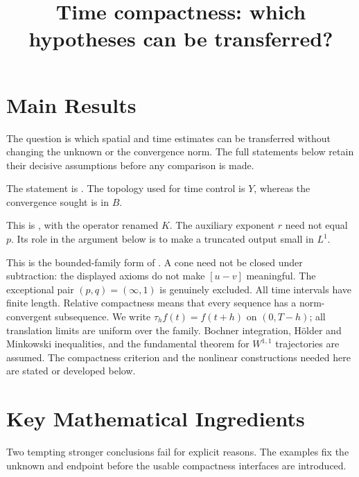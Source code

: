 \documentclass[12pt,reqno]{amsart}
\title{Time compactness: which hypotheses can be transferred?}
\date{}
\begin{document}
\maketitle
\section{Main Results}
The question is which spatial and time estimates can be transferred without changing the unknown or the convergence norm. The full statements below retain their decisive assumptions before any comparison is made.
\begin{theorem}[Simon]\label{thm:simon}

\end{theorem}
The statement is \cite[Theorem 5, pp.~84--85]{S-simon}. The topology used for time control is $Y$, whereas the convergence sought is in $B$.

\begin{theorem}[Maitre]\label{thm:maitre}

\end{theorem}
This is \cite[Theorem 2.1, p.~1726]{S-maitre}, with the operator renamed $K$. The auxiliary exponent $r$ need not equal $p$. Its role in the argument below is to make a truncated output small in $L^1$.

\begin{theorem}\label{thm:cone}

\end{theorem}
This is the bounded-family form of \cite[Theorem 1 and Remark 2, pp.~3--4]{S-barrett-suli}. A cone need not be closed under subtraction: the displayed axioms do not make $[u-v]$ meaningful. The exceptional pair $(p,q)=(\infty,1)$ is genuinely excluded.
All time intervals have finite length. Relative compactness means that every sequence has a norm-convergent subsequence. We write $\tau_h f(t)=f(t+h)$ on $(0,T-h)$; all translation limits are uniform over the family. Bochner integration, H\"older and Minkowski inequalities, and the fundamental theorem for $W^{1,1}$ trajectories are assumed. The compactness criterion and the nonlinear constructions needed here are stated or developed below.
\section{Key Mathematical Ingredients}
Two tempting stronger conclusions fail for explicit reasons. The examples fix the unknown and endpoint before the usable compactness interfaces are introduced.
\end{document}

